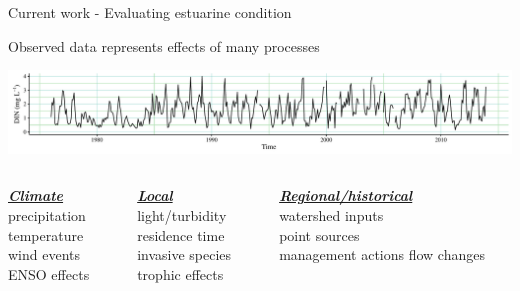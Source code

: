 \documentclass[serif]{beamer}\usepackage[]{graphicx}\usepackage[]{color}
\newcommand{\emtxt}[1]{\textbf{\textit{#1}}}
\begin{document}
\begin{frame}[t]{Current work - Evaluating estuarine condition}
{\bf \centerline{Observed data represents effects of many processes}}
\vspace{0.15in}
\centerline{\includegraphics[width = \textwidth]{fig/ts_ex.pdf}}
\vspace{0.15in}
\begin{columns}[t]
\begin{column}{0.3\textwidth}
{\bf \underline{\emtxt{Climate}}}\\
precipitation\\
temperature\\
wind events\\
ENSO effects
\end{column}
\begin{column}{0.3\textwidth}
{\bf \underline{\emtxt{Local}}}\\
light/turbidity\\
residence time\\
invasive species\\
trophic effects
\end{column}
\begin{column}{0.3\textwidth}
{\bf \underline{\emtxt{Regional/historical}}}\\
watershed inputs\\
point sources\\
management actions
flow changes
\end{column}
\end{columns}
\end{frame}
\end{document}
